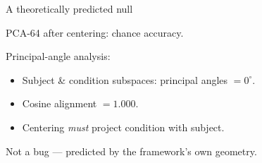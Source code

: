 \documentclass[11pt,aspectratio=169]{beamer}
\begin{document}
\begin{frame}{A theoretically predicted null}
  \vspace{0.4em}
  \begin{center}\large
    PCA-64 after centering: chance accuracy.
  \end{center}
  \vspace{0.6em}
  Principal-angle analysis:
  \begin{itemize}
    \item Subject \& condition subspaces: principal angles $= 0^\circ$.
    \item Cosine alignment $= 1.000$.
    \item Centering \emph{must} project condition with subject.
  \end{itemize}
  \vspace{0.4em}
  \begin{center}\color{sbnavy}
    Not a bug --- predicted by the framework's own geometry.
  \end{center}
\end{frame}
\end{document}
